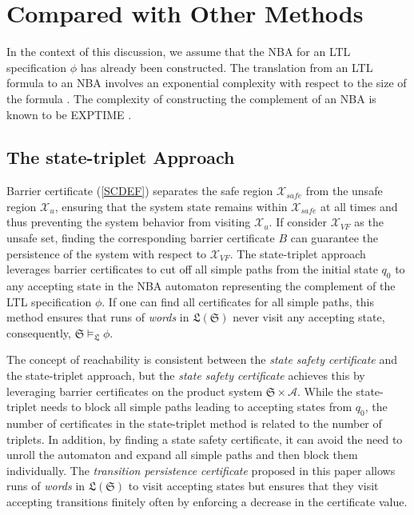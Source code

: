 \documentclass[acmlarge]{acmart}
\begin{document}
\section{Compared with Other Methods}
In the context of this discussion, we assume that the NBA for an LTL specification $\phi$ has already been constructed. The translation from an LTL formula to an NBA involves an exponential complexity with respect to the size of the formula \cite{vardi2005automata}. The complexity of constructing the complement of an NBA is known to be EXPTIME \cite{complementnba}.
\subsection{The state-triplet Approach}
Barrier certificate (\ref{SCDEF}) separates the safe region $\mathcal{X}_{safe}$ from the unsafe region $\mathcal{X}_{u}$, ensuring that the system state remains within $\mathcal{X}_{safe}$ at all times and thus preventing the system behavior from visiting $\mathcal{X}_{u}$. If consider $\mathcal{X}_{VF}$ as the unsafe set, finding the corresponding barrier certificate $B$ can guarantee the persistence of the system with respect to $\mathcal{X}_{VF}$. The state-triplet approach leverages barrier certificates to cut off all simple paths from the initial state \(q_0\) to any accepting state in the NBA automaton representing the complement of the LTL specification $\phi$. If one can find all certificates for all simple paths, this method ensures that runs of \emph{words} in $\mathfrak{L}(\mathfrak{S})$ never visit any accepting state, consequently, \(\mathfrak{S} \models_{\mathfrak{L}} \phi\).

The concept of reachability is consistent between the \emph{state safety certificate} and the state-triplet approach, but the \emph{state safety certificate} achieves this by leveraging barrier certificates on the product system $\mathfrak{S} \times \mathcal{A}$. While the state-triplet needs to block all simple paths leading to accepting states from $q_0$, the number of certificates in the state-triplet method is related to the number of triplets. In addition, by finding a state safety certificate, it can avoid the need to unroll the automaton and expand all simple paths and then block them individually. The \emph{transition persistence certificate} proposed in this paper allows runs of \emph{words} in $\mathfrak{L}(\mathfrak{S})$ to visit accepting states but ensures that they visit accepting transitions finitely often by enforcing a decrease in the certificate value.
\end{document}
